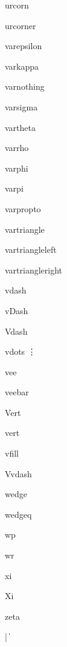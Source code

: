 \documentclass{article}
\begin{document}
urcorn    \urcorn{}

urcorner    \urcorner{}


varepsilon    \varepsilon{}

varkappa    \varkappa{}

varnothing    \varnothing{}

varsigma    \varsigma{}

vartheta    \vartheta{}

varrho    \varrho{}

varphi    \varphi{}

varpi    \varpi{}

varpropto    \varpropto{}

vartriangle    \vartriangle{}

vartriangleleft    \vartriangleleft{}

vartriangleright    \vartriangleright{}

vdash    \vdash{}

vDash    \vDash{}

Vdash    \Vdash{}

vdots    \vdots{}

vee    \vee{}

veebar    \veebar{}

Vert    \Vert{}

vert    \vert{}

vfill    \vfill{}

Vvdash    \Vvdash{}


wedge    \wedge{}

wedgeq    \wedgeq{}

wp    \wp{}

wr    \wr{}

xi    \xi{}

Xi    \Xi{}

zeta    \zeta{}

|    \|{}
\end{document}
